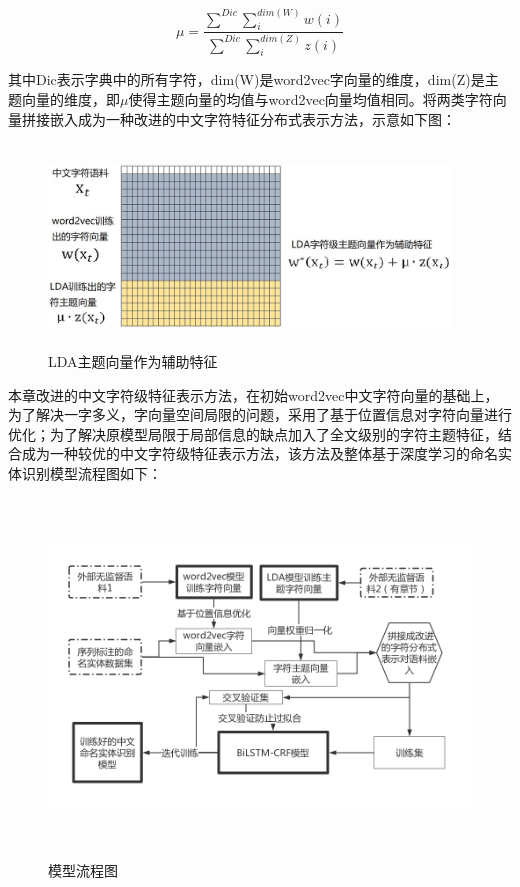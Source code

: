\documentclass[winfonts,master,oneside,nobackinfo]{njuthesis}
\begin{document}
\begin{equation}
\mu = \frac { \sum_{}^{Dic} {\sum_{i}^{dim(W)} w(i)}} { \sum_{}^{Dic} {\sum_{i}^{dim(Z)} z(i)}}
\end{equation}

其中Dic表示字典中的所有字符，dim(W)是word2vec字向量的维度，dim(Z)是主题向量的维度，即$\mu$使得主题向量的均值与word2vec向量均值相同。将两类字符向量拼接嵌入成为一种改进的中文字符特征分布式表示方法，示意如下图：

\begin{figure}[H]
\centering
\begin{minipage}[t]{\textwidth}
\includegraphics[width=0.95\textwidth,height=5.4cm]{./figure/主题向量拼接.jpg}
\caption{LDA主题向量作为辅助特征}
\label{lab:1}
\end{minipage}
\end{figure}

本章改进的中文字符级特征表示方法，在初始word2vec中文字符向量的基础上，为了解决一字多义，字向量空间局限的问题，采用了基于位置信息对字符向量进行优化；为了解决原模型局限于局部信息的缺点加入了全文级别的字符主题特征，结合成为一种较优的中文字符级特征表示方法，该方法及整体基于深度学习的命名实体识别模型流程图如下：

\begin{figure}[H]
\centering
\begin{minipage}[t]{\textwidth}
\includegraphics[width=1\textwidth,height=9.5cm]{./figure/改进的字符分布式表示.jpg}
\caption{模型流程图}
\label{lab:1}
\end{minipage}
\end{figure}
\end{document}
